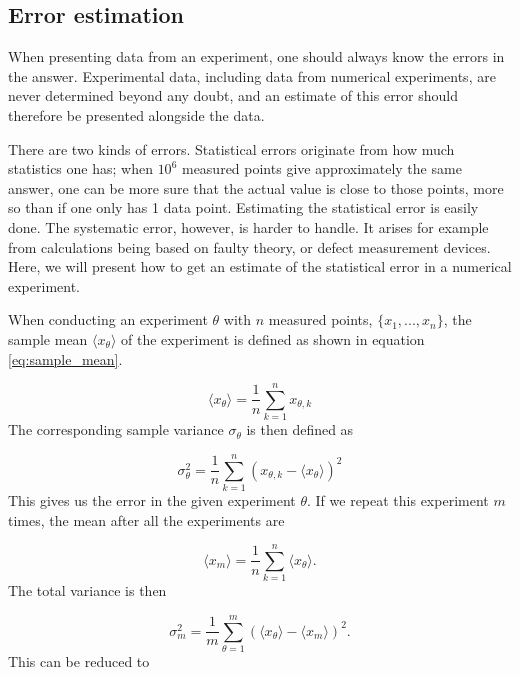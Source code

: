 \documentclass[norsk,a4paper,12pt]{article}
\begin{document}
\subsection{Error estimation} \label{Error_estimation}
When presenting data from an experiment, one should always know the errors in the answer. Experimental data, including data from numerical experiments, are never determined beyond any doubt, and an estimate of this error should therefore be presented alongside the data. \par
There are two kinds of errors. Statistical errors originate from how much statistics one has; when $10^6$ measured points give approximately the same answer, one can be more sure that the actual value is close to those points, more so than if one only has 1 data point. Estimating the statistical error is easily done. The systematic error, however, is harder to handle. It arises for example from calculations being based on faulty theory, or defect measurement devices. Here, we will present how to get an estimate of the statistical error in a numerical experiment.
\par 
\vspace{3mm}
When conducting an experiment $\theta$ with $n$ measured points, $ \{x_1, ..., x_n \}$, the sample mean $ \langle x_{\theta} \rangle$ of the experiment  is defined as shown in equation \ref{eq:sample_mean}.

\begin{equation}
\label{eq:sample_mean}
\langle x_{\theta} \rangle = \frac{1}{n} \sum_{k=1}^n x_{\theta,k}
\end{equation}
The corresponding sample variance $\sigma_{\theta}$ is then defined as

\begin{equation}
\sigma_{\theta}^2 = \frac{1}{n} \sum_{k=1}^n (x_{\theta,k} - \langle x_{\theta} \rangle )^2
\end{equation}
This gives us the error in the given experiment $\theta$. If we repeat this experiment $m$ times, the mean after all the experiments are

\begin{equation}
\label{eq:mean}
\langle x_{m} \rangle = \frac{1}{n} \sum_{k=1}^n  \langle x_{\theta} \rangle.
\end{equation}
The total variance is then

\begin{equation}
\sigma_m^2 = \frac{1}{m} \sum_{\theta=1}^m ( \langle x_{\theta} \rangle - \langle x_{m} \rangle )^2.
\end{equation}
This can be reduced to 
\end{document}

